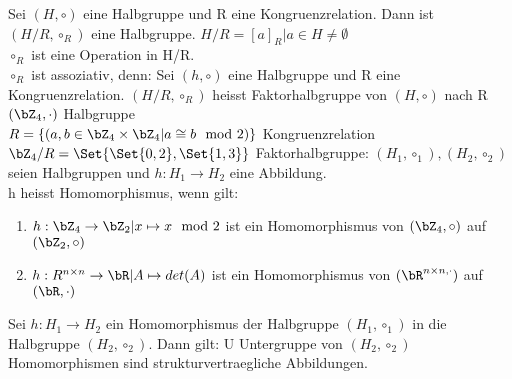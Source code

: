 Sei $(H,\circ)$ eine Halbgruppe und R eine Kongruenzrelation. Dann ist
$(H/R,\circ_R)$ eine Halbgruppe.
$H/R = {[a]_R | a \in H \neq \emptyset}$\\
$\circ_R$ ist eine Operation in H/R.\\
$\circ_R$ ist assoziativ, denn:
Sei $(h, \circ)$ eine Halbgruppe und R eine Kongruenzrelation. $(H/R,\circ_R)$
heisst Faktorhalbgruppe von $(H, \circ)$ nach R
$(\bZ_4,\cdot)$ Halbgruppe\\ 
$R = \{(a,b \in \bZ_4 \times \bZ_4 | a \cong b \mod 2)\}$ Kongruenzrelation\\
$\bZ_4/R = \Set{\Set{0,2},\Set {1,3}}$
Faktorhalbgruppe:
$(H_1,\circ_1), (H_2,\circ_2)$ seien Halbgruppen und  $h: H_1 \rightarrow H_2$
eine Abbildung.\\
h heisst Homomorphismus, wenn gilt:
\begin{enumerate}
	\item $h: \bZ_4 \rightarrow \bZ_2 | x \mapsto x\mod 2$ ist ein Homomorphismus
   von $(\bZ_4,\circ)$ auf $(\bZ_2,\circ)$
   \item $h: R^{n \times n} \rightarrow \bR | A \mapsto det(A)$ ist ein
     Homomorphismus von $(\bR^{n \times n, \cdot})$ auf $(\bR,\cdot)$
   \end{enumerate}
   Sei $h: H_1 \rightarrow H_2$ ein Homomorphismus der Halbgruppe
   $(H_1,\circ_1)$ in die Halbgruppe $(H_2,\circ_2)$. Dann gilt:
   U Untergruppe von $(H_2, \circ_2)$
   Homomorphismen sind strukturvertraegliche Abbildungen.
